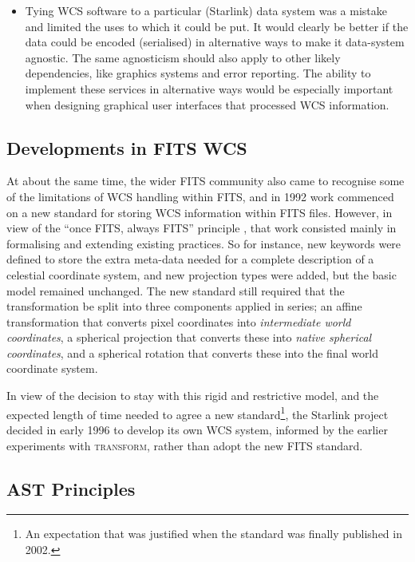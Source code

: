 \documentclass[final,authoryear,5p,times,twocolumn]{elsarticle}
\begin{document}
\begin{itemize}
\item Tying WCS software to a particular (Starlink) data system was a
  mistake and limited the uses to which it could be put. It would
  clearly be better if the data could be encoded (serialised) in
  alternative ways to make it data-system agnostic. The same
  agnosticism should also apply to other likely dependencies, like
  graphics systems and error reporting.  The ability to implement
  these services in alternative ways would be especially important
  when designing graphical user interfaces that processed WCS
  information.

\end{itemize}

\subsection{Developments in FITS WCS}

At about the same time, the wider FITS community also came to recognise
some of the limitations of WCS handling within FITS, and in 1992 work commenced
on a new standard for storing WCS information within FITS files. However,
in view of the ``once FITS, always FITS'' principle \citep[see e.g.][]{1997ASPC..125..257W}, that work consisted
mainly in formalising and extending existing practices. So for instance, new
keywords were defined to store the extra meta-data needed for a complete
description of a celestial coordinate system, and new projection types were
added, but the basic model remained unchanged. The new standard still required
that the transformation be split into three components applied in series; an
affine transformation that converts pixel coordinates into \emph{intermediate
world coordinates}, a spherical projection that converts these into \emph{native
spherical coordinates}, and a spherical rotation that converts these into the
final world coordinate system.

In view of the decision to stay with this rigid and restrictive model,
and the expected length of time needed to agree a new standard\footnote{An
expectation that was justified when the standard was finally published in 2002.},
the Starlink project decided in early 1996 to develop its own WCS system, informed
by the earlier experiments with \textsc{transform}, rather than adopt the new FITS
standard.

\subsection{AST Principles}
\end{document}

